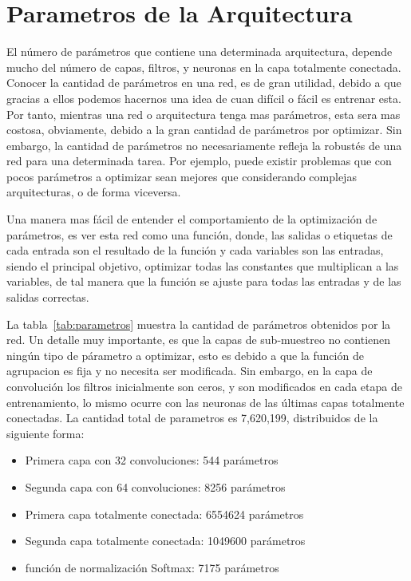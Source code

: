 \section{Parametros de la Arquitectura}

El número de parámetros que contiene una determinada arquitectura, depende mucho del número de capas, filtros, y neuronas en la capa totalmente conectada. Conocer la cantidad de parámetros en una red, es de gran utilidad, debido a que gracias a ellos podemos hacernos una idea de cuan difícil o fácil es entrenar esta. Por tanto, mientras una red o arquitectura tenga mas parámetros, esta sera mas costosa, obviamente, debido a la gran cantidad de parámetros por optimizar. Sin embargo, la cantidad de parámetros no necesariamente refleja la robustés de una red para una determinada tarea. Por ejemplo, puede existir problemas que con pocos parámetros a optimizar sean mejores que considerando complejas arquitecturas, o de forma viceversa.

Una manera mas fácil de entender el comportamiento de la optimización de parámetros, es ver esta red como una función, donde, las salidas o etiquetas de cada entrada son el resultado de la función y cada variables son las entradas, siendo el principal objetivo, optimizar todas las constantes que multiplican a las variables, de tal manera que la función se ajuste para todas las entradas y de las salidas correctas. 

La tabla~\ref{tab:parametros} muestra la cantidad de parámetros obtenidos por la red. Un detalle muy importante, es que la capas de sub-muestreo no contienen ningún tipo de párametro a optimizar, esto es debido a que la función de agrupacion es fija y no necesita ser modificada. Sin embargo, en la capa de convolución los filtros inicialmente son ceros, y son modificados en cada etapa de entrenamiento, lo mismo ocurre con las neuronas de las últimas capas totalmente conectadas. La cantidad total de parametros es 7,620,199, distribuidos de la siguiente forma: 

\begin{itemize}
\item Primera capa con 32 convoluciones: 544 parámetros
\item Segunda capa con 64 convoluciones: 8256 parámetros
\item Primera capa totalmente conectada: 6554624 parámetros
\item Segunda capa totalmente conectada: 1049600 parámetros
\item función de normalización Softmax: 7175 parámetros
\end{itemize}

